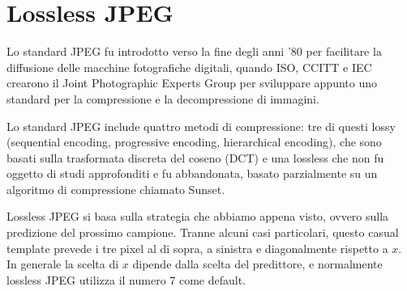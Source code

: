 \section{Lossless JPEG}
Lo standard JPEG fu introdotto verso la fine degli anni '80 per facilitare la diffusione delle macchine fotografiche digitali, quando ISO, CCITT e IEC crearono il Joint Photographic Experts Group per sviluppare appunto uno standard per la compressione e la decompressione di immagini.

Lo standard JPEG include quattro metodi di compressione: tre di questi lossy (sequential encoding, progressive encoding, hierarchical encoding), che sono basati sulla trasformata discreta del coseno (DCT) e una lossless che non fu oggetto di studi approfonditi e fu abbandonata, basato parzialmente su un algoritmo di compressione chiamato Sunset. 

\vspace{5mm}

Lossless JPEG si basa sulla strategia che abbiamo appena visto, ovvero sulla predizione del prossimo campione. Tranne alcuni casi particolari, questo casual template prevede i tre pixel al di sopra, a sinistra e diagonalmente rispetto a \(x\). In generale la scelta di \(x\) dipende dalla scelta del predittore, e normalmente lossless JPEG utilizza il numero 7 come default.

